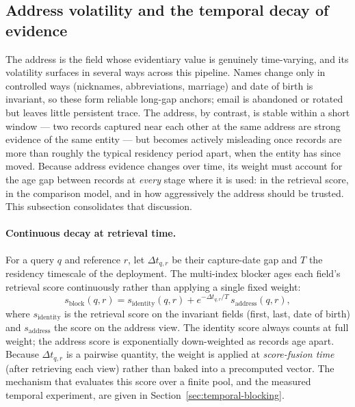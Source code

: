 \documentclass[11pt]{article}
\begin{document}
\subsection{Address volatility and the temporal decay of evidence}
\label{sec:address-decay}
The address is the field whose evidentiary value is genuinely time-varying, and its volatility surfaces in several ways across this pipeline. Names change only in controlled ways (nicknames, abbreviations, marriage) and date of birth is invariant, so these form reliable long-gap anchors; email is abandoned or rotated but leaves little persistent trace. The address, by contrast, is stable within a short window --- two records captured near each other at the same address are strong evidence of the same entity --- but becomes actively misleading once records are more than roughly the typical residency period apart, when the entity has since moved. Because address evidence changes over time, its weight must account for the age gap between records at \emph{every} stage where it is used: in the retrieval score, in the comparison model, and in how aggressively the address should be trusted. This subsection consolidates that discussion.

\paragraph{Continuous decay at retrieval time.}
For a query $q$ and reference $r$, let $\Delta t_{q,r}$ be their capture-date gap and $T$ the residency timescale of the deployment. The multi-index blocker ages each field's retrieval score continuously rather than applying a single fixed weight:
\begin{equation}
 s_{\mathrm{block}}(q,r) = s_{\mathrm{identity}}(q,r) + e^{-\Delta t_{q,r}/T}\,s_{\mathrm{address}}(q,r),
\label{eq:gapblock}
\end{equation}
where $s_{\mathrm{identity}}$ is the retrieval score on the invariant fields (first, last, date of birth) and $s_{\mathrm{address}}$ the score on the address view. The identity score always counts at full weight; the address score is exponentially down-weighted as records age apart. Because $\Delta t_{q,r}$ is a pairwise quantity, the weight is applied at \emph{score-fusion time} (after retrieving each view) rather than baked into a precomputed vector. The mechanism that evaluates this score over a finite pool, and the measured temporal experiment, are given in Section~\ref{sec:temporal-blocking}.
\end{document}
